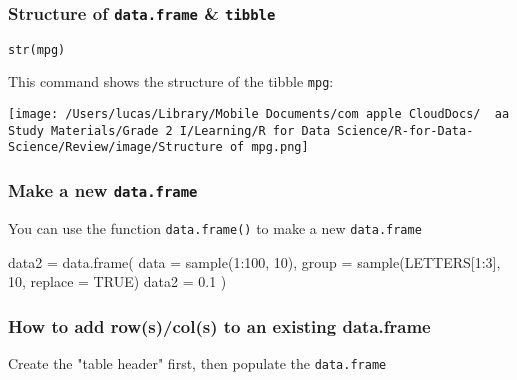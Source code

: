 \documentclass[
]{article}
\newenvironment{Shaded}{}{}
\newcommand{\AttributeTok}[1]{\textcolor[rgb]{0.49,0.56,0.16}{#1}}
\newcommand{\ConstantTok}[1]{\textcolor[rgb]{0.53,0.00,0.00}{#1}}
\newcommand{\DecValTok}[1]{\textcolor[rgb]{0.25,0.63,0.44}{#1}}
\newcommand{\FloatTok}[1]{\textcolor[rgb]{0.25,0.63,0.44}{#1}}
\newcommand{\FunctionTok}[1]{\textcolor[rgb]{0.02,0.16,0.49}{#1}}
\newcommand{\NormalTok}[1]{#1}
\newcommand{\OtherTok}[1]{\textcolor[rgb]{0.00,0.44,0.13}{#1}}
\newcommand{\SpecialCharTok}[1]{\textcolor[rgb]{0.25,0.44,0.63}{#1}}
\begin{document}
\hypertarget{structure-of-dataframe--tibble}{%
\subsubsection{\texorpdfstring{Structure of \texttt{data.frame} \&
\texttt{tibble}}{Structure of data.frame \& tibble}}\label{structure-of-dataframe--tibble}}

\texttt{str(mpg)}

This command shows the structure of the tibble \texttt{mpg}:

\texttt{[image: /Users/lucas/Library/Mobile Documents/com~apple~CloudDocs/~~aa Study Materials/Grade 2 I/Learning/R for Data Science/R-for-Data-Science/Review/image/Structure of mpg.png]}

\hypertarget{make-a-new-dataframe}{%
\subsubsection{\texorpdfstring{Make a new
\texttt{data.frame}}{Make a new data.frame}}\label{make-a-new-dataframe}}

You can use the function \texttt{data.frame()} to make a new
\texttt{data.frame}

\begin{Shaded}
\begin{Highlighting}[]
\NormalTok{data2 }\OtherTok{=}
	\FunctionTok{data.frame}\NormalTok{(}
  	\AttributeTok{data =} \FunctionTok{sample}\NormalTok{(}\DecValTok{1}\SpecialCharTok{:}\DecValTok{100}\NormalTok{, }\DecValTok{10}\NormalTok{),}
    \AttributeTok{group =} \FunctionTok{sample}\NormalTok{(LETTERS[}\DecValTok{1}\SpecialCharTok{:}\DecValTok{3}\NormalTok{], }\DecValTok{10}\NormalTok{, }\AttributeTok{replace =} \ConstantTok{TRUE}\NormalTok{)}
    \AttributeTok{data2 =} \FloatTok{0.1}
\NormalTok{  )}
\end{Highlighting}
\end{Shaded}

\hypertarget{how-to-add-rowscols-to-an-existing-dataframe}{%
\subsubsection{How to add row(s)/col(s) to an existing
data.frame}\label{how-to-add-rowscols-to-an-existing-dataframe}}

Create the "table header" first, then populate the \texttt{data.frame}
\end{document}
